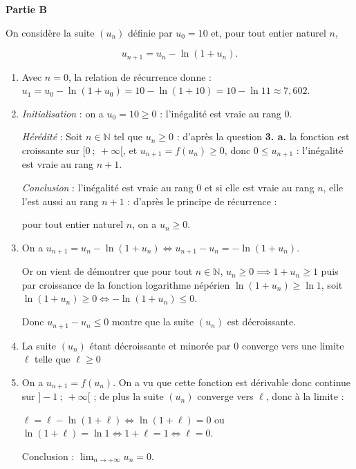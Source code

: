 \documentclass[10pt]{article}
\providecommand{\N}{\mathbb{N}}
\begin{document}
\medskip

\textbf{Partie B}

\medskip

On considère la suite $\left(u_n\right)$ définie par $u_0 = 10$ et, pour tout entier naturel $n$,

\[u_{n+1} = u_n - \ln \left(1 + u_n\right).\]



\medskip

\begin{enumerate}
\item Avec $n = 0$, la relation de récurrence donne :
$u_1 = u_0 - \ln (1 + u_0) = 10 - \ln (1 + 10) = 10 - \ln 11 \approx 7,602$.


\item 

\emph{Initialisation } : on a $u_0 = 10 \geqslant 0$ : l'inégalité est vraie au rang 0.

\emph{Hérédité } : Soit $n \in \N$ tel que $u_n \geqslant 0$ : d'après la question \textbf{3. a.} la fonction est croissante sur $[0~;~+ \infty[$, et $u_{n+1} = f\left(u_n\right) \geqslant 0$, donc $0 \leqslant u_{n+1}$ : l'inégalité est vraie au rang $n + 1$.

\emph{Conclusion } : l'inégalité est vraie au rang 0 et si elle est vraie au rang $n$, elle l'est aussi au rang $n + 1$ : d'après le principe de récurrence :

pour tout entier naturel $n$, on a $u_n \geqslant 0$.
\item 
On a $u_{n+1} = u_n - \ln \left(1 + u_n\right) \iff u_{n+1} - u_n = - \ln \left(1 + u_n\right)$.

Or on vient de démontrer que pour tout $n \in \N$, \: $u_n \geqslant 0 \implies 1 + u_n \geqslant 1$ puis par croissance de la fonction logarithme népérien $\ln (1 + u_n) \geqslant \ln 1$, soit  $\ln (1 + u_n) \geqslant 0 \iff - \ln (1 + u_n) \leqslant 0$.

Donc $u_{n+1} - u_n \leqslant 0$ montre que la suite $\left(u_n\right)$ est décroissante.
\item 

La suite $\left(u_n\right)$ étant décroissante et minorée par $0$ converge vers une limite $\ell$ telle que $\ell \geqslant 0$
\item 
On a $u_{n+1} = f\left(u_n\right)$. On a vu que cette fonction est dérivable donc continue sur $]- 1~;~+ \infty[$ ; de plus la suite $\left(u_n\right)$ converge vers $\ell$, donc à la limite :

$\ell = \ell - \ln \left(1 + \ell\right) \iff \ln \left(1 + \ell\right) = 0$ ou $\ln \left(1 + \ell\right) = \ln 1 \iff 1 + \ell = 1 \iff \ell = 0$.

Conclusion : $\displaystyle\lim_{n \to + \infty} u_n = 0$.
\end{enumerate}

\medskip

\medskip
\end{document}
